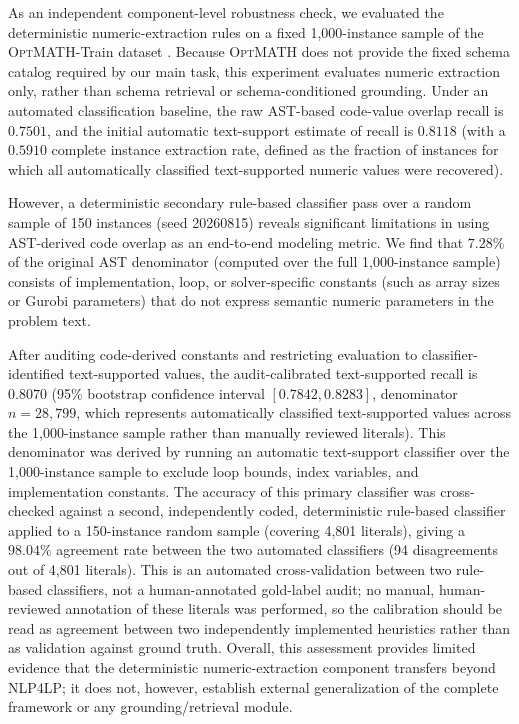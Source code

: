 \documentclass[3p]{elsarticle}
\begin{document}
As an independent component-level robustness check, we evaluated the deterministic numeric-extraction rules on a fixed 1,000-instance sample of the \textsc{OptMATH}-Train dataset \cite{lu2025optmath}. Because \textsc{OptMATH} does not provide the fixed schema catalog required by our main task, this experiment evaluates numeric extraction only, rather than schema retrieval or schema-conditioned grounding. Under an automated classification baseline, the raw AST-based code-value overlap recall is $0.7501$, and the initial automatic text-support estimate of recall is $0.8118$ (with a $0.5910$ complete instance extraction rate, defined as the fraction of instances for which all automatically classified text-supported numeric values were recovered). 

However, a deterministic secondary rule-based classifier pass over a random sample of 150 instances (seed 20260815) reveals significant limitations in using AST-derived code overlap as an end-to-end modeling metric. We find that $7.28\%$ of the original AST denominator (computed over the full 1,000-instance sample) consists of implementation, loop, or solver-specific constants (such as array sizes or Gurobi parameters) that do not express semantic numeric parameters in the problem text.

After auditing code-derived constants and restricting evaluation to classifier-identified text-supported values, the audit-calibrated text-supported recall is $0.8070$ (95\% bootstrap confidence interval $[0.7842, 0.8283]$, denominator $n=28{,}799$, which represents automatically classified text-supported values across the 1,000-instance sample rather than manually reviewed literals). This denominator was derived by running an automatic text-support classifier over the 1,000-instance sample to exclude loop bounds, index variables, and implementation constants. The accuracy of this primary classifier was cross-checked against a second, independently coded, deterministic rule-based classifier applied to a 150-instance random sample (covering 4,801 literals), giving a $98.04\%$ agreement rate between the two automated classifiers (94 disagreements out of 4,801 literals). This is an automated cross-validation between two rule-based classifiers, not a human-annotated gold-label audit; no manual, human-reviewed annotation of these literals was performed, so the calibration should be read as agreement between two independently implemented heuristics rather than as validation against ground truth. Overall, this assessment provides limited evidence that the deterministic numeric-extraction component transfers beyond \textsc{NLP4LP}; it does not, however, establish external generalization of the complete framework or any grounding/retrieval module.
\end{document}
